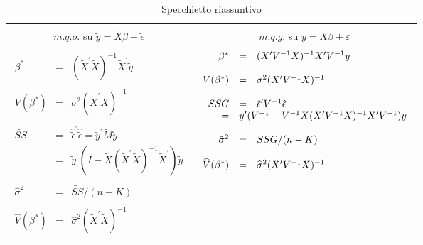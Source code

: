 \documentclass[a4paper]{report}
\theoremstyle{remark}
\begin{document}
\begin{enumerate}
\begin{table}[h]
\caption{Specchietto riassuntivo}
\label{tab:Spe}\vspace{0.5cm} 
\begin{tabular}{|c|c|}
\hline
&  \\ 
$m.q.o.$ su $\tilde{y}=\tilde{X}\beta +\tilde{\epsilon}$ & $m.q.g.$ su $%
y=X\beta +\varepsilon$ \\ \hline
&  \\ 
$%
\begin{array}{rcl}
\beta ^{\ast } & = & (\tilde{X}^{\prime }\tilde{X})^{-1}\tilde{X}^{\prime }%
\tilde{y} \\ 
&  &  \\ 
V(\beta ^{\ast }) & = & \sigma ^{2}(\tilde{X}^{\prime }\tilde{X})^{-1} \\ 
&  &  \\ 
\tilde{SS} & = & {\hat{\tilde{\epsilon}}}^{\prime }\hat{\tilde{\epsilon}}=%
\tilde{y}^{\prime }\widetilde{M}\tilde{y} \\ 
& = & \tilde{y}^{\prime }(I-\tilde{X}(\tilde{X}^{\prime }\tilde{X})^{-1}%
\tilde{X}^{\prime })\tilde{y} \\ 
&  &  \\ 
\hat{\sigma}^{2} & = & \tilde{SS}/(n-K) \\ 
&  &  \\ 
\widehat{V}(\beta ^{\ast }) & = & \widehat{\sigma }^{2}(\tilde{X}^{\prime }%
\tilde{X})^{-1}%
\end{array}%
$ & $%
\begin{array}{rcl}
\beta ^{\ast } & = & (X^{\prime }V^{-1}X)^{-1}X^{\prime }V^{-1}y \\ 
&  &  \\ 
V(\beta ^{\ast }) & = & \sigma ^{2}(X^{\prime }V^{-1}X)^{-1} \\ 
&  &  \\ 
SSG & = & \hat{\epsilon}^{\prime }V^{-1}\hat{\epsilon} \\ 
= & \multicolumn{2}{l}{y^{\prime }(V^{-1}-V^{-1}X(X^{\prime
}V^{-1}X)^{-1}X^{\prime }V^{-1})y} \\ 
&  &  \\ 
\hat{\sigma}^{2} & = & SSG/(n-K) \\ 
&  &  \\ 
\widehat{V}(\beta ^{\ast }) & = & \widehat{\sigma }^{2}(X^{\prime
}V^{-1}X)^{-1}%
\end{array}%
$ \\ \hline
\end{tabular}%
\end{table}


\end{enumerate}
\end{document}
